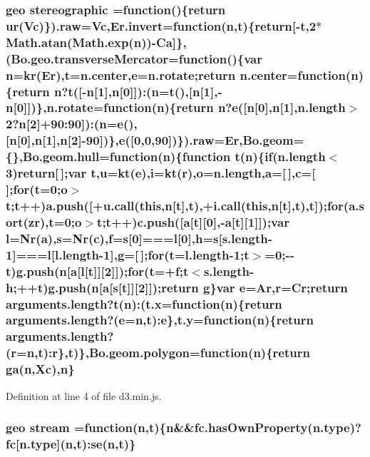 \subsubsection[{stereographic}]{ {\bf geo} stereographic =function()\{{\bf return} {\bf ur}({\bf Vc})\}).raw={\bf Vc},Er.\+invert=function({\bf n},t)\{{\bf return}[-\/t,2$\ast$Math.\+atan(Math.\+exp({\bf n}))-\/{\bf Ca}]\},(Bo.\+geo.\+transverse\+Mercator=function()\{var {\bf n}={\bf kr}({\bf Er}),t=n.\+center,{\bf e}=n.\+rotate;{\bf return} n.\+center=function({\bf n})\{{\bf return} {\bf n}?t([-\/{\bf n}[1],{\bf n}[0]])\+:({\bf n}=t(),[{\bf n}[1],-\/{\bf n}[0]])\},n.\+rotate=function({\bf n})\{{\bf return} {\bf n}?{\bf e}([{\bf n}[0],{\bf n}[1],n.\+length$>$2?{\bf n}[2]+90\+:90])\+:({\bf n}={\bf e}(),[{\bf n}[0],{\bf n}[1],{\bf n}[2]-\/90])\},{\bf e}([0,0,90])\}).raw={\bf Er},Bo.\+geom=\{\},Bo.\+geom.\+hull=function({\bf n})\{function t({\bf n})\{{\bf if}(n.\+length$<$3){\bf return}[$\,$];var t,u=kt({\bf e}),{\bf i}=kt({\bf r}),{\bf o}=n.\+length,{\bf a}=[$\,$],{\bf c}=[$\,$];{\bf for}(t=0;{\bf o}$>$t;t++)a.\+push([+{\bf u.\+call}({\bf this},{\bf n}[t],t),+{\bf i.\+call}({\bf this},{\bf n}[t],t),t]);{\bf for}({\bf a.\+sort}({\bf zr}),t=0;{\bf o}$>$t;t++)c.\+push([{\bf a}[t][0],-\/{\bf a}[t][1]]);var l={\bf Nr}({\bf a}),s={\bf Nr}({\bf c}),{\bf f}=s[0]===l[0],h=s[s.\+length-\/1]===l[l.\+length-\/1],g=[$\,$];{\bf for}(t=l.\+length-\/1;t$>$=0;-\/-\/t)g.\+push({\bf n}[{\bf a}[l[t]][2]]);{\bf for}(t=+{\bf f};t$<$s.\+length-\/h;++t)g.\+push({\bf n}[{\bf a}[s[t]][2]]);{\bf return} g\}var {\bf e}={\bf Ar},{\bf r}={\bf Cr};{\bf return} arguments.\+length?t({\bf n})\+:({\bf t.\+x}=function({\bf n})\{{\bf return} arguments.\+length?({\bf e}={\bf n},t)\+:{\bf e}\},t.\+y=function({\bf n})\{{\bf return} arguments.\+length?({\bf r}={\bf n},t)\+:{\bf r}\},t)\},Bo.\+geom.\+polygon=function({\bf n})\{{\bf return} {\bf ga}({\bf n},{\bf Xc}),{\bf n}\}}\label{d3_8min_8js_ac3bfceffa290e4e620c85bc7a9db6e88}


Definition at line 4 of file d3.\+min.\+js.

\subsubsection[{stream}]{ {\bf geo} stream =function({\bf n},t)\{{\bf n}\&\&fc.\+has\+Own\+Property(n.\+type)?{\bf fc}[n.\+type]({\bf n},t)\+:se({\bf n},t)\}}\label{d3_8min_8js_a2adc41d97d1eec0692474e7c89719f61}


